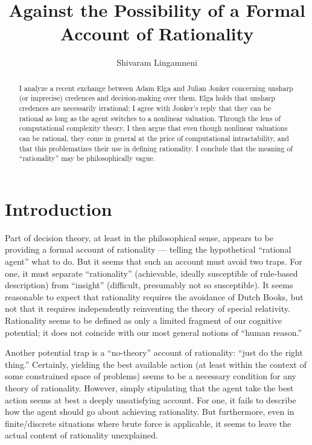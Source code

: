 \documentclass[letterpaper,12pt]{article}
\begin{document}
\title{Against the Possibility of a Formal Account of Rationality}
\author{Shivaram Lingamneni}
\maketitle


\begin{abstract}
I analyze a recent exchange between Adam Elga and Julian Jonker concerning unsharp (or imprecise) credences and decision-making over them. Elga holds that unsharp credences are necessarily irrational; I agree with Jonker's reply that they can be rational as long as the agent switches to a nonlinear valuation. Through the lens of computational complexity theory, I then argue that even though nonlinear valuations can be rational, they come in general at the price of computational intractability, and that this problematizes their use in defining rationality. I conclude that the meaning of ``rationality'' may be philosophically vague.
\end{abstract}

\section{Introduction}
Part of decision theory, at least in the philosophical sense, appears to be providing a formal account of rationality --- telling the hypothetical ``rational agent'' what to do. But it seems that such an account must avoid two traps. For one, it must separate ``rationality'' (achievable, ideally susceptible of rule-based description) from ``insight'' (difficult, presumably not so susceptible). It seems reasonable to expect that rationality requires the avoidance of Dutch Books, but not that it requires independently reinventing the theory of special relativity. Rationality seems to be defined as only a limited fragment of our cognitive potential; it does not coincide with our most general notions of ``human reason.''

Another potential trap is a ``no-theory'' account of rationality: ``just do the right thing.'' Certainly, yielding the best available action (at least within the context of some constrained space of problems) seems to be a necessary condition for any theory of rationality. However, simply stipulating that the agent take the best action seems at best a deeply unsatisfying account. For one, it fails to describe how the agent should go about achieving rationality. But furthermore, even in finite/discrete situations where brute force is applicable, it seems to leave the actual content of rationality unexplained.
\end{document}

